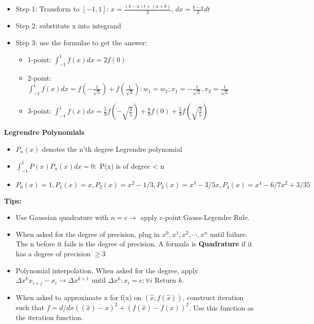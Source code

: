\documentclass{article}
\begin{document}
\begin{minipage}[t]{0.49\textwidth}
\begin{itemize}
    \item Step 1: Transform to \([-1,1]\): \( x = \frac{(b-a)t + (a+b)}{2} \), \( dx = \frac{b-a}{2}dt \)
    \item Step 2: substitute x into integrand
    \item Step 3: use the formulae to get the answer:
    \begin{itemize}
      \item 1-point: $\int_{-1}^1f(x)dx=2f(0)$
      \item 2-point: $\int_{-1}^1f(x)dx=f(-\frac{1}{\sqrt{3}})+f(\frac{1}{\sqrt{3}}): w_1=w_2;x_1=-\frac{1}{\sqrt{3}}, x_2 = \frac{1}{\sqrt{3}}$
      \item 3-point: $\int_{-1}^1f(x)dx=\frac{5}{9}f(-\sqrt{\frac{3}{5}})+\frac{8}{9}f(0)+\frac{5}{9}f(\sqrt{\frac{3}{5}})$
    \end{itemize}
\end{itemize}

\textbf{Legrendre Polynomials}
\begin{itemize}
    \item{$P_n(x)$ denotes the n'th degree Legrendre polynomial } 
    \item{$\int_{-1}^1 P(x)P_n(x)dx = 0: $ P(x) is of degree < n}
    \item{$P_0(x)=1, P_1(x)=x, P_2(x) = x^2-1/3, P_3(x)=x^3-3/5x, P_4(x)=x^4-6/7x^2+3/35$}
  \end{itemize}

\textbf{Tips:}
\begin{itemize}
  \item{Use Gaussian quadrature with $n=c\rightarrow$ apply c-point Gauss-Legendre Rule.}
  \item{When asked for the degree of precision, plug in $x^0, x^1, x^2, \cdots, x^n$ until failure. The n before it fails is the degree of precision. A formula is \textbf{Quadrature} if it has a degree of precision $\ge 3$}
  \item{Polynomial interpolation. When asked for the degree, apply $\Delta x^k x_{i+j}-x_i \rightarrow \Delta x^{k+1}$} until $\Delta x^k: x_{i}=c: \forall i$ Return $k$.
  \item{When asked to approximate x for f(x) on $(\hat{x}, f(\hat{x}))$, construct iteration such that $f=d/dx((\hat{x})-x)^2+(f(\hat{x})-f(x))^2$}. Use this function as the iteration function.
\end{itemize}


\end{minipage}
\end{document}
